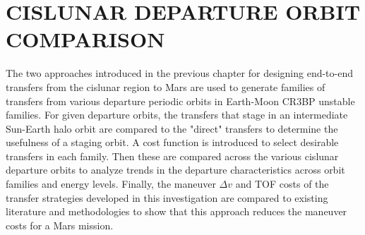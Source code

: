 \chapter{CISLUNAR DEPARTURE ORBIT COMPARISON}

The two approaches introduced in the previous chapter for designing end-to-end transfers from the
cislunar region to Mars are used to generate families of transfers from various departure periodic
orbits in Earth-Moon CR3BP unstable families. For given departure orbits, the transfers that stage
in an intermediate Sun-Earth halo orbit are compared to the "direct" transfers to determine the
usefulness of a staging orbit. A cost function is introduced to select desirable transfers in each
family. Then these are compared across the various cislunar departure orbits to analyze trends in
the departure characteristics across orbit families and energy levels. Finally, the maneuver
$\Delta v$ and TOF costs of the transfer strategies developed in this investigation are compared to
existing literature and methodologies to show that this approach reduces the maneuver costs for a
Mars mission.




